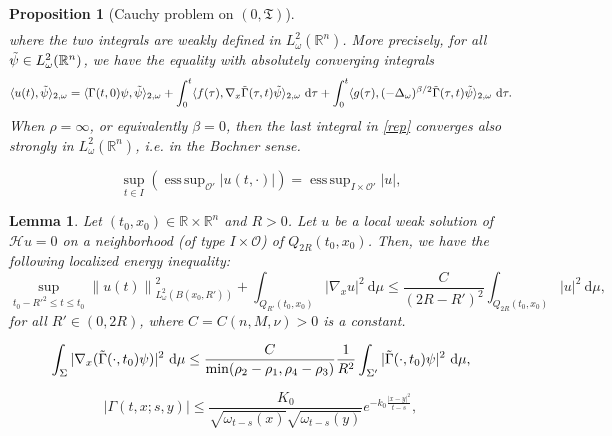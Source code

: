 \documentclass[10pt,a4paper]{amsart}
\newtheorem{prop}{Proposition}
\newtheorem{lem}{Lemma}
\DeclareMathOperator*{\supess}{ess\,sup}
\begin{document}
\begin{prop}[Cauchy problem on $(0,\mathfrak{T})$]
\begin{align}
\end{align}
where the two integrals are weakly defined in $L^2_\omega(\mathbb{R}^n)$. More precisely,  for all $\Tilde{\psi}\in L^2_\omega(\mathbb{R}^n)$, we have the equality with absolutely converging integrals
    \begin{align*}
        \langle u(t), \Tilde{\psi} \rangle_{2,\omega} = \langle \Gamma(t,0)\psi, \Tilde{\psi} \rangle_{2,\omega}+ \int_{0}^{t} \langle f(\tau), \nabla_x \Tilde{\Gamma}(\tau,t)\Tilde{\psi} \rangle_{2,\omega}\  \mathrm d \tau + \int_{0}^{t} \langle  g(\tau),(-\Delta_\omega)^{\beta/2}\Tilde{\Gamma}(\tau,t) \Tilde{\psi} \rangle_{2,\omega} \ \mathrm d \tau.
    \end{align*}
When $\rho=\infty$, or equivalently $\beta = 0$, then the last integral in \eqref{rep} converges also strongly in $L^2_\omega(\mathbb{R}^n)$, \textit{i.e.} in the Bochner sense.
\end{prop}

\begin{equation}\label{sup pour sol faibles}
        \sup_{t \in I} \left ( \supess_{\mathcal{O'}} \left | u(t,\cdot) \right | \right ) = \supess_{I \times \mathcal{O'}} \left | u \right |,
\end{equation}

\begin{lem}\label{lem:Caccioppoli}
    Let $(t_0,x_0)\in \mathbb{R}\times \mathbb{R}^n$ and $R>0$. Let $u$ be a local weak solution of $\mathcal{H}u=0$ on a neighborhood (of type $I \times \mathcal{O}$) of $Q_{2R}(t_0,x_0)$. Then, we have the following localized energy inequality:
    \begin{equation*}
       \sup_{t_0-R'^2 \leq t \leq t_0 } \left\|u(t) \right\|^2_{L^2_\omega(B(x_0,R'))} + \int_{Q_{R'}(t_0,x_0)} \left | \nabla_x u \right |^2 \ \mathrm d\mu \leq \frac{C}{(2R-R')^2} \int_{Q_{2R}(t_0,x_0)} \left |  u \right |^2 \ \mathrm d\mu,
    \end{equation*}
    for all $R'\in (0,2R)$, where $C=C(n,M,\nu)>0$ is a constant.
\end{lem}

\begin{equation}\label{Variante Caccioppoli}
    \int_{\Sigma} | \nabla_x (\Tilde{\Gamma}(\cdot,t_0)\psi) |^2 \ \mathrm{d\mu} \leq \frac{C}{\min(\rho_2 - \rho_1, \rho_4 - \rho_3)} \frac{1}{R^2} \int_{\Sigma'} | \Tilde{\Gamma}(\cdot,t_0)\psi |^2 \ \mathrm{d\mu},
\end{equation}

\begin{equation}\label{pgb}
    \left | \Gamma(t,x;s,y) \right | \leq \frac{K_0}{\sqrt{\omega_{t-s}(x)}\sqrt{\omega_{t-s}(y)}} e^{-k_0 \frac{|x-y|^2}{t-s}},
\end{equation}
\end{document}
